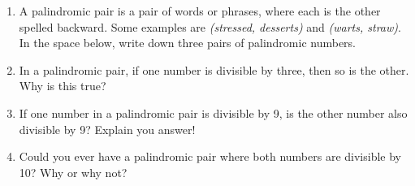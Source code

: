 \documentclass{article}
\begin{document}
\begin{enumerate}
\newpage

\item A palindromic pair is a pair of words or phrases, where each is the other spelled backward. Some examples are \textit{(stressed, desserts)} and \textit{(warts, straw)}. In the space below, write down three pairs of palindromic numbers.

\vspace{2in}

\item In a palindromic pair, if one number is divisible by three, then so is the other. Why is this true?

\vspace{3in}

\item If one number in a palindromic pair is divisible by 9, is the other number also divisible by 9? Explain you answer!

\newpage

\item Could you ever have a palindromic pair where both numbers are divisible by 10? Why or why not?



\end{enumerate}
\end{document}
